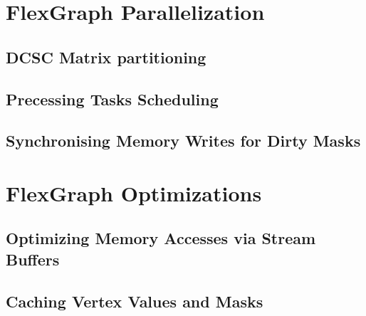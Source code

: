 \section{FlexGraph Parallelization}

\subsection{DCSC Matrix partitioning}

\subsection{Precessing Tasks Scheduling}

\subsection{Synchronising Memory Writes for Dirty Masks}

\section{FlexGraph Optimizations}

\subsection{Optimizing Memory Accesses via Stream Buffers}

\subsection{Caching Vertex Values and Masks}
